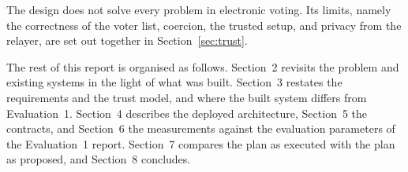 The design does not solve every problem in electronic voting. Its limits,
namely the correctness of the voter list, coercion, the trusted setup, and
privacy from the relayer, are set out together in Section~\ref{sec:trust}.

The rest of this report is organised as follows. Section~2 revisits the
problem and existing systems in the light of what was built. Section~3 restates
the requirements and the trust model, and where the built system differs from
Evaluation~1. Section~4 describes the deployed architecture, Section~5 the
contracts, and Section~6 the measurements against the evaluation parameters of
the Evaluation~1 report. Section~7 compares the plan as executed with the plan
as proposed, and Section~8 concludes.
